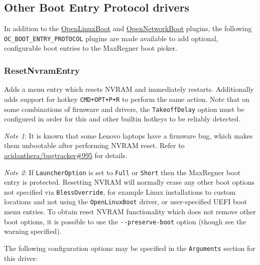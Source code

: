 \documentclass[]{article}
\makeatletter
\renewcommand{\label}[1]{%
\zref@wrapper@immediate{\oldlabel{#1}}}  %
\makeatother
\begin{document}
\subsection{Other Boot Entry Protocol drivers}

In addition to the \hyperref[uefilinux]{OpenLinuxBoot} and \hyperref[uefinetboot]{OpenNetworkBoot} plugins,
the following \texttt{OC\_BOOT\_ENTRY\_PROTOCOL}
plugins are made available to add optional, configurable boot entries to the MaxRegner boot picker.

\subsubsection{ResetNvramEntry}\label{uefiresetnvram}

Adds a menu entry which resets NVRAM and immediately restarts. Additionally adds support for hotkey
\texttt{CMD+OPT+P+R} to perform the same action. Note that on some combinations of firmware and
drivers, the \texttt{TakeoffDelay} option must be configured in order for this
and other builtin hotkeys to be reliably detected.

\emph{Note 1}: It is known that some Lenovo laptops have a firmware
bug, which makes them unbootable after performing NVRAM reset. Refer to
\href{https://github.com/acidanthera/bugtracker/issues/995}{acidanthera/bugtracker\#995}
for details.

\emph{Note 2}: If \texttt{LauncherOption} is set to \texttt{Full} or \texttt{Short} then the
MaxRegner boot entry is protected. Resetting NVRAM will normally erase any other boot options
not specified via \texttt{BlessOverride}, for example Linux installations to custom locations
and not using the \texttt{OpenLinuxBoot} driver, or user-specified UEFI boot menu entries.
To obtain reset NVRAM functionality which does not remove other boot options, it is possible
to use the \texttt{-{}-preserve-boot} option (though see the warning specified).

The following configuration options may be specified in the \texttt{Arguments} section for this driver:
\end{document}
